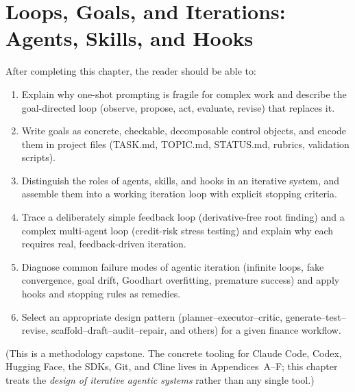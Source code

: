 \chapter{Loops, Goals, and Iterations: Agents, Skills, and Hooks}
\label{ch:loops-goals-iterations}

\begin{remark}
After completing this chapter, the reader should be able to:
\begin{enumerate}
  \item Explain why one-shot prompting is fragile for complex work and describe
        the goal-directed loop (observe, propose, act, evaluate, revise) that
        replaces it.
  \item Write goals as concrete, checkable, decomposable control objects, and
        encode them in project files (TASK.md, TOPIC.md, STATUS.md, rubrics,
        validation scripts).
  \item Distinguish the roles of agents, skills, and hooks in an iterative
        system, and assemble them into a working iteration loop with explicit
        stopping criteria.
  \item Trace a deliberately simple feedback loop (derivative-free root finding)
        and a complex multi-agent loop (credit-risk stress testing) and explain
        why each requires real, feedback-driven iteration.
  \item Diagnose common failure modes of agentic iteration (infinite loops,
        fake convergence, goal drift, Goodhart overfitting, premature success)
        and apply hooks and stopping rules as remedies.
  \item Select an appropriate design pattern (planner--executor--critic,
        generate--test--revise, scaffold--draft--audit--repair, and others) for
        a given finance workflow.
\end{enumerate}
(This is a methodology capstone. The concrete tooling for Claude Code, Codex,
Hugging Face, the SDKs, Git, and Cline lives in Appendices~A--F; this chapter
treats the \emph{design of iterative agentic systems} rather than any single
tool.)
\end{remark}

